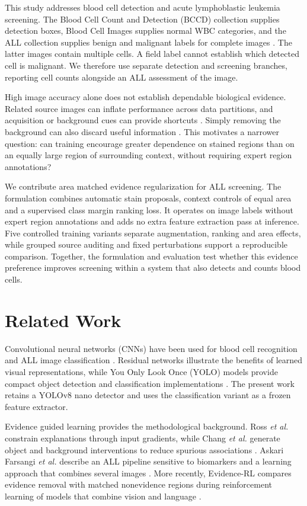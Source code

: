 \documentclass[conference,letterpaper]{IEEEtran}
\begin{document}
This study addresses blood cell detection and acute lymphoblastic leukemia screening. The Blood Cell Count and Detection (BCCD) collection supplies detection boxes, Blood Cell Images supplies normal WBC categories, and the ALL collection supplies benign and malignant labels for complete images \cite{bccd,mooney,all_data}. The latter images contain multiple cells. A field label cannot establish which detected cell is malignant. We therefore use separate detection and screening branches, reporting cell counts alongside an ALL assessment of the image.

High image accuracy alone does not establish dependable biological evidence. Related source images can inflate performance across data partitions, and acquisition or background cues can provide shortcuts \cite{kapoor,leakage_questions,geirhos}. Simply removing the background can also discard useful information \cite{viewstudy,biomarker}. This motivates a narrower question: can training encourage greater dependence on stained regions than on an equally large region of surrounding context, without requiring expert region annotations?

We contribute area matched evidence regularization for ALL screening. The formulation combines automatic stain proposals, context controls of equal area and a supervised class margin ranking loss. It operates on image labels without expert region annotations and adds no extra feature extraction pass at inference. Five controlled training variants separate augmentation, ranking and area effects, while grouped source auditing and fixed perturbations support a reproducible comparison. Together, the formulation and evaluation test whether this evidence preference improves screening within a system that also detects and counts blood cells.

\section{Related Work}
Convolutional neural networks (CNNs) have been used for blood cell recognition and ALL image classification \cite{matek,ghader}. Residual networks illustrate the benefits of learned visual representations, while You Only Look Once (YOLO) models provide compact object detection and classification implementations \cite{resnet,yolo,ultralytics}. The present work retains a YOLOv8 nano detector and uses the classification variant as a frozen feature extractor.

Evidence guided learning provides the methodological background. Ross \emph{et al.} constrain explanations through input gradients, while Chang \emph{et al.} generate object and background interventions to reduce spurious associations \cite{ross,chang}. Askari Farsangi \emph{et al.} describe an ALL pipeline sensitive to biomarkers and a learning approach that combines several images \cite{biomarker}. More recently, Evidence-RL compares evidence removal with matched nonevidence regions during reinforcement learning of models that combine vision and language \cite{evidencerl}.
\end{document}
